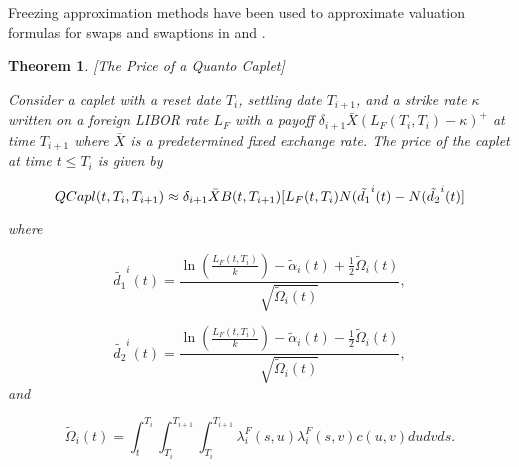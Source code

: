 \documentclass[11pt]{article}
\newtheorem{theorem}{Theorem}[section]
\newcommand{\filt}{\ensuremath{\mathcal{F}}}
\begin{document}
Freezing approximation methods have been used to approximate valuation formulas for swaps and swaptions in \cite{brigo2007interest} and \cite{wu}.




 


\begin{theorem}\label{cap}[The Price of a Quanto Caplet]\label{quanto caplet}

Consider a caplet with a reset date $T_i$, settling date $T_{i+1}$, and a strike rate $\kappa$ written on a foreign LIBOR rate $L_F$ with a payoff $\delta_{i+1}\bar{X} (L_F(T_i,T_i)-\kappa)^+$ at time $T_{i+1}$ where $\bar{X}$ is a predetermined fixed exchange rate. The price of the caplet at time $t\leq T_i$ is given by

\begin{equation*}
    QCapl(t,T_i,T_{i+1})\approx\delta_{i+1}\Bar{X}B(t,T_{i+1})[L_F(t,T_i)N(\tilde{d_1}^i(t)-N(\tilde{d_2}^i(t)]
\end{equation*}

where 

\begin{equation*}
\tilde{d_1}^i(t)=    \frac{\ln\left(\frac{L_F(t,T_i)}{k}\right)-\tilde{\alpha}_i(t)+\frac{1}{2}\tilde{\Omega}_i(t)}{\sqrt{\tilde{\Omega}_i(t)}},
\end{equation*}

\begin{equation*}
\tilde{d_2}^i(t)=\frac{\ln\left(\frac{L_F(t,T_i)}{k}\right)-\tilde{\alpha}_i(t)-\frac{1}{2}\tilde{\Omega}_i(t)}{\sqrt{\tilde{\Omega}_i(t)}},
\end{equation*}
and

\begin{equation*}
\tilde{\Omega}_i(t)=\int_t^{T_i}\int_{T_i}^{T_{i+1}}\int_{T_i}^{T_{i+1}}\lambda_i^F(s,u)\lambda_i^F(s,v)c(u,v)dudvds.
\end{equation*}
\end{theorem}
\end{document}
